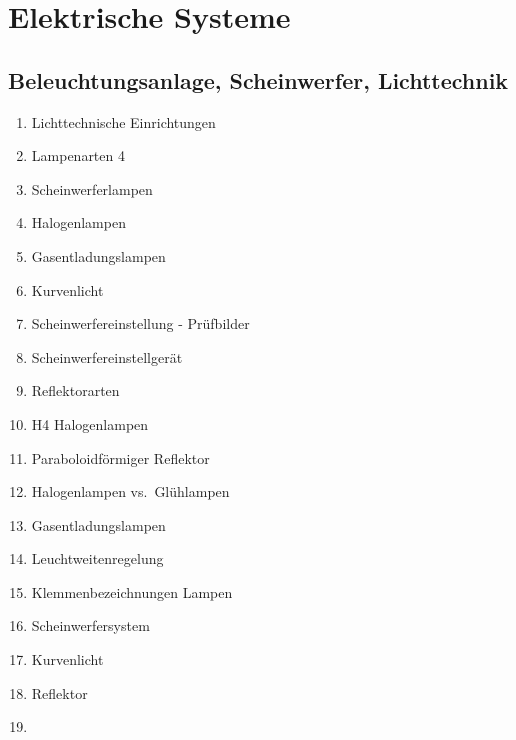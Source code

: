 \section{Elektrische Systeme}\label{elektrische-systeme}

\subsection{Beleuchtungsanlage, Scheinwerfer,
Lichttechnik}\label{beleuchtungsanlage-scheinwerfer-lichttechnik}

\begin{enumerate}
\item
  Lichttechnische Einrichtungen\\
\item
  Lampenarten 4
\item
  Scheinwerferlampen\\
\item
  Halogenlampen\\
\item
  Gasentladungslampen\\
\item
  Kurvenlicht\\
\item
  Scheinwerfereinstellung - Prüfbilder\\
\item
  Scheinwerfereinstellgerät\\
\item
  Reflektorarten\\
\item
  H4 Halogenlampen\\
\item
  Paraboloidförmiger Reflektor\\
\item
  Halogenlampen vs.~Glühlampen\\
\item
  Gasentladungslampen\\
\item
  Leuchtweitenregelung\\
\item
  Klemmenbezeichnungen Lampen\\
\item
  Scheinwerfersystem\\
\item
  Kurvenlicht\\
\item
  Reflektor\\
\item

\end{enumerate}
